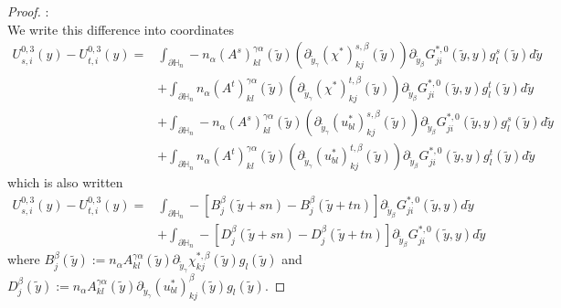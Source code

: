 \documentclass[11pt, reqno]{amsart}
\theoremstyle{definition}
\theoremstyle{remark}
\numberwithin{equation}{section}
\begin{document}
\begin{proof}[Proof]
		:\\
		\noindent	We write this difference into coordinates 
		\begin{align*}
			U_{s,i}^{0,3}(y)- 	U_{t,i}^{0,3}(y)
			=&\int_{\partial\mathbb{H}_n}-n_\alpha (A^s)^{\gamma\alpha}_{kl} (\tilde{y})\left(\partial_{ \tilde{y}_\gamma} (\chi^{*})^{s,\beta}_{kj}\left(\tilde{y} \right)  \right) \partial_{ \tilde{y}_\beta} G^{*,0}_{ji}\left(\tilde{y},y\right)  g^s_l(\tilde{y}) d\tilde{y}\\
			&+	\int_{\partial\mathbb{H}_n}n_\alpha (A^t)^{\gamma\alpha}_{kl} (\tilde{y})\left(\partial_{ \tilde{y}_\gamma} (\chi^{*})^{t,\beta}_{kj}\left(\tilde{y} \right)  \right) \partial_{ \tilde{y}_\beta} G^{*,0}_{ji}\left(\tilde{y},y\right)  g^t_l(\tilde{y}) d\tilde{y}\\
			& +\int_{\partial\mathbb{H}_n}-n_\alpha (A^s)^{\gamma\alpha}_{kl} (\tilde{y})\left(\partial_{ \tilde{y}_\gamma} (u_{bl}^{*})^{s,\beta}_{kj} \left(\tilde{y} \right)\right) \partial_{ \tilde{y}_\beta} G^{*,0}_{ji}\left(\tilde{y},y\right)  g^s_l(\tilde{y}) d\tilde{y}\\
			&+\int_{\partial\mathbb{H}_n}n_\alpha (A^t)^{\gamma\alpha}_{kl} (\tilde{y})\left(\partial_{ \tilde{y}_\gamma}(u_{bl}^{*})^{t,\beta}_{kj}  \left(\tilde{y} \right)\right) \partial_{ \tilde{y}_\beta} G^{*,0}_{ji}\left(\tilde{y},y\right)  g^t_l(\tilde{y}) d\tilde{y}
		\end{align*}
		which is also written
		\begin{align*}
			U_{s,i}^{0,3}(y)- 	U_{t,i}^{0,3}(y)
			=&\int_{\partial\mathbb{H}_n}- [B^{\beta}_{j}\left(\tilde{y}+sn \right) -B^{\beta}_{j}\left(\tilde{y}+tn \right)]    \partial_{ \tilde{y}_\beta} G^{*,0}_{ji}\left(\tilde{y},y\right) d\tilde{y}\\
			&+\int_{\partial\mathbb{H}_n}- [D^{\beta}_{j}\left(\tilde{y}+sn \right) -D^{\beta}_{j}\left(\tilde{y}+tn \right)]    \partial_{ \tilde{y}_\beta} G^{*,0}_{ji}\left(\tilde{y},y\right) d\tilde{y}
		\end{align*}
		where  $B_j^{\beta}(\tilde{y}):=n_\alpha A^{\gamma\alpha}_{kl}(\tilde{y})\partial_{ \tilde{y}_\gamma} \chi_{kj}^{*,\beta}(\tilde{y}) g_l(\tilde{y}) $ and   $D_j^{\beta}(\tilde{y}):=n_\alpha A^{\gamma\alpha}_{kl}(\tilde{y})\partial_{ \tilde{y}_\gamma}(u_{bl}^{*})^{\beta}_{kj} (\tilde{y}) g_l(\tilde{y}). $ 
		

\end{proof}
\end{document}
